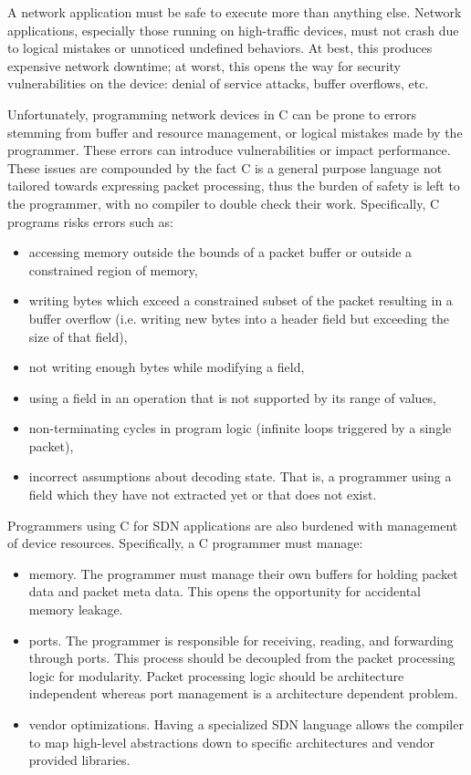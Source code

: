 A network application must be safe to execute more than anything else.
Network applications, especially those running on high-traffic devices, must not
crash due to logical mistakes or unnoticed undefined behaviors.
At best, this produces expensive network downtime; at worst, this
opens the way for security vulnerabilities on the device:
denial of service attacks, buffer overflows, etc.

Unfortunately, programming network devices in C can be prone
to errors stemming from buffer and resource management, or logical mistakes made by the programmer. These errors can introduce vulnerabilities or impact performance.
These issues are compounded by the fact C is a general
purpose language not tailored towards expressing packet processing, thus the burden of
safety
is left to the programmer, with no compiler to double check their work.
Specifically, C programs risks errors such as:

\begin{itemize}
\item accessing memory outside the bounds of a packet buffer or outside a
constrained
region of memory,

\item writing bytes which exceed a constrained subset of the packet
resulting in a buffer overflow (i.e. writing new bytes into a header field
but exceeding the size of that field),

\item not writing enough bytes while modifying a field,

\item using a field in an operation that is not supported by its
range of values,

\item non-terminating cycles in program logic (infinite loops
triggered by a single packet),

\item incorrect assumptions about decoding state. That is, a programmer using
a field which they have not extracted yet or that does not exist.
\end{itemize}

Programmers using C for SDN applications are also burdened with management of
device resources. Specifically, a C programmer must manage:

\begin{itemize}
\item memory. The programmer must manage their own buffers for holding packet
data and packet meta data. This opens the opportunity for accidental
memory leakage.

\item ports. The programmer is responsible for receiving, reading, and
forwarding
through ports. This process should be decoupled from the packet processing logic
for modularity. Packet processing logic should be architecture
independent
whereas port management is a architecture dependent problem.

\item vendor optimizations. Having a specialized SDN language allows the compiler to map high-level abstractions down to specific architectures and vendor provided libraries.
\end{itemize}


